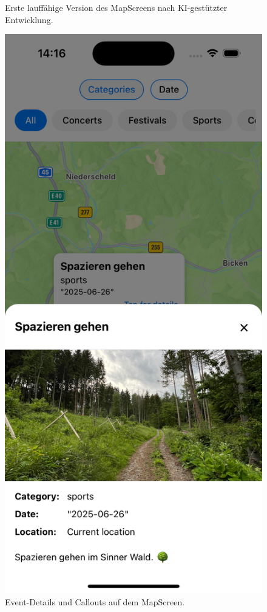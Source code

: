 \begin{figure}[htbp]
\begin{minipage}{0.48\textwidth}
            \caption{Erste lauffähige Version des MapScreens nach KI-gestützter Entwicklung.}
      \end{minipage}
      \hfill
      \begin{minipage}{0.48\textwidth}
            \centering
            \includegraphics[width=\textwidth]{images/copilot_screenshots/Callouts+modal-copilot.png}
            \caption{Event-Details und Callouts auf dem MapScreen.}
            \label{fig:copilot-callouts}
      \end{minipage}
\end{figure}

